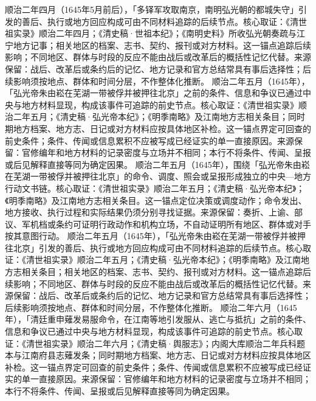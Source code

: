 顺治二年四月（1645年5月前后），「多铎军攻取南京，南明弘光朝的都城失守」引发的善后、执行或地方回应构成可由不同材料追踪的后续节点。核心取证：《清世祖实录》顺治二年四月；《清史稿·世祖本纪》；《南明史料》所收弘光朝奏疏与江宁地方记事；相关地区的档案、志书、契约、报刊或对方材料。这一锚点追踪后续影响；不同地区、群体与时段的反应不能由战后或改革后的概括性记忆代替。来源保留：战后、改革后或条约后的记忆、地方记录和官方总结常具有事后选择性；后续影响须按地点、群体和时间分层，不作整体化推断。
顺治二年五月（1645年），「弘光帝朱由崧在芜湖一带被俘并被押往北京」之前的条件、信息和争议已通过中央与地方材料显现，构成该事件可追踪的前史节点。核心取证：《清世祖实录》顺治二年五月；《清史稿·弘光帝本纪》；《明季南略》及江南地方志相关条目；同时期地方档案、地方志、日记或对方材料应按具体地区补检。这一锚点界定可回查的前史条件；条件、传闻或信息累积不应被写成已经证实的单一直接原因。来源保留：官修编年和地方材料的记录密度与立场并不相同；本行不将条件、传闻、呈报或后见解释直接等同为确定因果。
顺治二年五月（1645年），围绕「弘光帝朱由崧在芜湖一带被俘并被押往北京」的命令、调度、照会或呈报形成独立的中央—地方行动文书链。核心取证：《清世祖实录》顺治二年五月；《清史稿·弘光帝本纪》；《明季南略》及江南地方志相关条目。这一锚点定位决策或调度动作；命令发出、地方接收、执行过程和实际结果仍须分别寻找证据。来源保留：奏折、上谕、部议、军机档或条约可证明行政动作和机构立场，不自动证明所有地区、群体或对手按其意图行动。
顺治二年五月（1645年），「弘光帝朱由崧在芜湖一带被俘并被押往北京」引发的善后、执行或地方回应构成可由不同材料追踪的后续节点。核心取证：《清世祖实录》顺治二年五月；《清史稿·弘光帝本纪》；《明季南略》及江南地方志相关条目；相关地区的档案、志书、契约、报刊或对方材料。这一锚点追踪后续影响；不同地区、群体与时段的反应不能由战后或改革后的概括性记忆代替。来源保留：战后、改革后或条约后的记忆、地方记录和官方总结常具有事后选择性；后续影响须按地点、群体和时间分层，不作整体化推断。
顺治二年六月（1645年），「清廷重申薙发易服命令，在江南等地引发服从、逃亡与抵抗」之前的条件、信息和争议已通过中央与地方材料显现，构成该事件可追踪的前史节点。核心取证：《清世祖实录》顺治二年六月；《清史稿·舆服志》；内阁大库顺治二年兵科题本与江南府县志薙发条；同时期地方档案、地方志、日记或对方材料应按具体地区补检。这一锚点界定可回查的前史条件；条件、传闻或信息累积不应被写成已经证实的单一直接原因。来源保留：官修编年和地方材料的记录密度与立场并不相同；本行不将条件、传闻、呈报或后见解释直接等同为确定因果。
